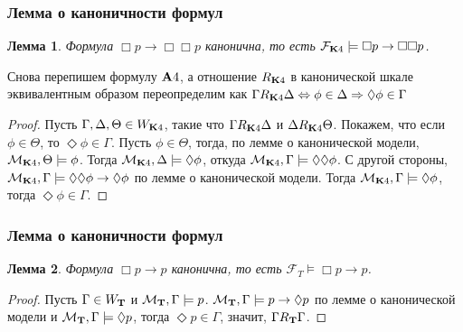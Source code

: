 \documentclass[pdf,utf8,russian,aspectratio=169]{beamer}
\newtheorem{lem}{Лемма}
\begin{document}
\begin{frame}
  \frametitle{Лемма о каноничности формул}

  \begin{lem}
    Формула $\Box p \to \Box \Box p$ канонична, то есть $\mathcal{F}_{{\bf K} 4} \models \Box p \to \Box \Box p$.
  \end{lem}

  Снова перепишем формулу ${\bf A}4$, а отношение $R_{{\bf K} 4}$ в канонической шкале эквивалентным образом переопределим как $\Gamma R_{{\bf K}4} \Delta \Leftrightarrow \phi \in \Delta \Rightarrow \Diamond \phi \in \Gamma$

  \begin{proof}
    Пусть $\Gamma, \Delta, \Theta \in W_{{\bf K}4}$, такие что $\Gamma R_{{\bf K} 4} \Delta$ и $\Delta R_{{\bf K} 4} \Theta$. Покажем, что если $\phi \in \Theta$,
    то $\Diamond \phi \in \Gamma$. Пусть $\phi \in \Theta$, тогда, по лемме о канонической модели, $\mathcal{M}_{{\bf K}4}, \Theta \models \phi$. Тогда
    $\mathcal{M}_{{\bf K}4}, \Delta \models \Diamond \phi$, откуда $\mathcal{M}_{{\bf K}4}, \Gamma \models \Diamond \Diamond \phi$. С другой стороны,
    $\mathcal{M}_{{\bf K}4}, \Gamma \models \Diamond \Diamond \phi \to \Diamond \phi$ по лемме о канонической модели.
    Тогда $\mathcal{M}_{{\bf K}4}, \Gamma \models \Diamond \phi$, тогда $\Diamond \phi \in \Gamma$.
  \end{proof}
\end{frame}

\begin{frame}
  \frametitle{Лемма о каноничности формул}

  \begin{lem}
    Формула $\Box p \to p$ канонична, то есть $\mathcal{F}_{T} \models \Box p \to p$.
  \end{lem}

\begin{proof}
  Пусть $\Gamma \in W_{\bf T}$ и $\mathcal{M}_{\bf T}, \Gamma \models p$.
  $\mathcal{M}_{\bf T}, \Gamma \models p \to \Diamond p$ по лемме о канонической модели и
  $\mathcal{M}_{\bf T}, \Gamma \models \Diamond p$, тогда $\Diamond p \in \Gamma$, значит, $\Gamma R_{\bf T} \Gamma$.
\end{proof}

\end{frame}
\end{document}
